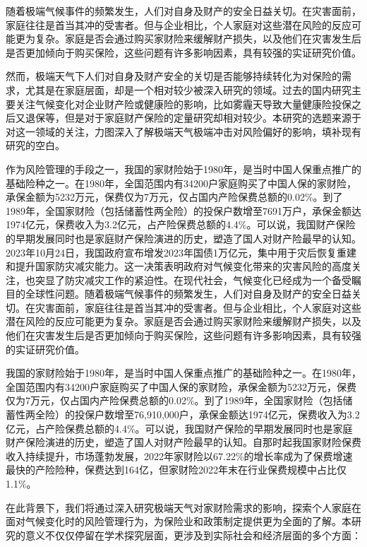 随着极端气候事件的频繁发生，人们对自身及财产的安全日益关切。在灾害面前，家庭往往是首当其冲的受害者。但与企业相比，个人家庭对这些潜在风险的反应可能更为复杂。家庭是否会通过购买家财险来缓解财产损失，以及他们在灾害发生后是否更加倾向于购买保险，这些问题有许多影响因素，具有较强的实证研究价值。

然而，极端天气下人们对自身及财产安全的关切是否能够持续转化为对保险的需求，尤其是在家庭层面，却是一个相对较少被深入研究的领域。过去的国内研究主要关注气候变化对企业财产险或健康险的影响，比如雾霾天导致大量健康险投保之后又退保等，但是对于家庭财产保险的定量研究却相对较少。本研究的选题来源于对这一领域的关注，力图深入了解极端天气极端冲击对风险偏好的影响，填补现有研究的空白。

作为风险管理的手段之一，我国的家财险始于1980年，是当时中国人保重点推广的基础险种之一。在1980年，全国范围内有34200户家庭购买了中国人保的家财险，承保金额为5232万元，保费仅为7万元，仅占国内产险保费总额的0.02\%。到了1989年，全国家财险（包括储蓄性两全险）的投保户数增至7691万户，承保金额达1974亿元，保费收入为3.2亿元，占产险保费总额的4.4\%。可以说，我国财产保险的早期发展同时也是家庭财产保险演进的历史\citep{黄英君2008论我国产险公司分散性业务营销模式的创新}，塑造了国人对财产险最早的认知。
2023年10月24日，我国政府宣布增发2023年国债1万亿元，集中用于灾后恢复重建和提升国家防灾减灾能力。这一决策表明政府对气候变化带来的灾害风险的高度关注，也突显了防灾减灾工作的紧迫性。在现代社会，气候变化已经成为一个备受瞩目的全球性问题。随着极端气候事件的频繁发生，人们对自身及财产的安全日益关切。在灾害面前，家庭往往是首当其冲的受害者。但与企业相比，个人家庭对这些潜在风险的反应可能更为复杂。家庭是否会通过购买家财险来缓解财产损失，以及他们在灾害发生后是否更加倾向于购买保险，这些问题有许多影响因素，具有较强的实证研究价值。

我国的家财险始于1980年，是当时中国人保重点推广的基础险种之一。在1980年，全国范围内有34200户家庭购买了中国人保的家财险，承保金额为5232万元，保费仅为7万元，仅占国内产险保费总额的0.02\%。到了1989年，全国家财险（包括储蓄性两全险）的投保户数增至76,910,000户，承保金额达1974亿元，保费收入为3.2亿元，占产险保费总额的4.4\%。可以说，我国财产保险的早期发展同时也是家庭财产保险演进的历史\citep{黄英君2008论我国产险公司分散性业务营销模式的创新}，塑造了国人对财产险最早的认知。自那时起我国家财险保费收入持续提升，市场蓬勃发展，2022年家财险以67.22\%的增长率成为了保费增速最快的产险险种，保费达到164亿，但家财险2022年末在行业保费规模中占比仅1.1\%。

在此背景下，我们将通过深入研究极端天气对家财险需求的影响，探索个人家庭在面对气候变化时的风险管理行为，为保险业和政策制定提供更为全面的了解。本研究的意义不仅仅停留在学术探究层面，更涉及到实际社会和经济层面的多个方面：

